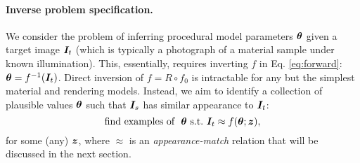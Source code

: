 \paragraph{Inverse problem specification.}
We consider the problem of inferring procedural model parameters $\bm{\theta}$ given a target image $\bm{I}_t$  (which is typically a photograph of a material sample under known illumination).
This, essentially, requires inverting $f$ in Eq. \eqref{eq:forward}: $\bm{\theta} = f^{-1}(\bm{I}_t)$. Direct inversion of $f = R \circ f_0$ is intractable for any but the simplest material and rendering models.
Instead, we aim to identify a collection of plausible values $\bm{\theta}$ such that $\bm{I}_s$ has similar appearance to $\bm{I}_t$:
\begin{equation}
	\label{eq:approx}
	\mbox{find examples of } \ \bm{\theta} \ \mbox{s.t.} \ \bm{I}_t \approx f(\bm{\theta}; \bm{z}),
\end{equation}
for some (any) $\bm{z}$, where $\approx$ is an \emph{appearance-match} relation that will be discussed in the next section.
